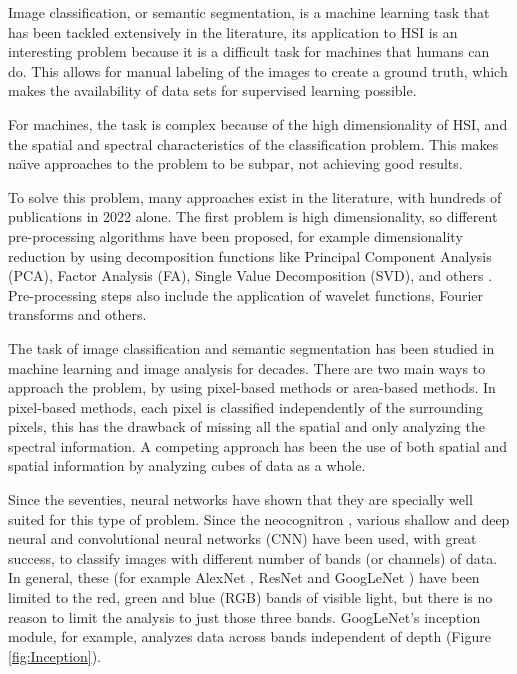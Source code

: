 \documentclass[lettersize, journal]{IEEEtran}
\begin{document}
Image classification, or semantic segmentation, is a machine learning task that has been tackled extensively in the literature, its application to HSI is an interesting problem because it is a difficult task for machines that humans can do. This allows for manual labeling of the images to create a ground truth, which makes the availability of data sets for supervised learning possible.

For machines, the task is complex because of the high dimensionality of HSI, and the spatial and spectral characteristics of the classification problem. This makes na\"{\i}ve approaches to the problem to be subpar, not achieving good results.

To solve this problem, many approaches exist in the literature, with hundreds of publications in 2022 alone. The first problem is high dimensionality, so different pre-processing algorithms have been proposed, for example dimensionality reduction by using decomposition functions like Principal Component Analysis (PCA), Factor Analysis (FA), Single Value Decomposition (SVD), and others \cite{meng_lightweight_2022}. Pre-processing steps also include the application of wavelet functions, Fourier transforms \cite{miclea_local_2020} and others.

\IEEEpubidadjcol

The task of image classification and semantic segmentation has been studied in machine learning and image analysis for decades. There are two main ways to approach the problem, by using pixel-based methods or area-based methods. In pixel-based methods, each pixel is classified independently of the surrounding pixels, this has the drawback of missing all the spatial and only analyzing the spectral information.
A competing approach has been the use of both spatial and spatial information by analyzing cubes of data as a whole.

Since the seventies, neural networks have shown that they are specially well suited for this type of problem. Since the neocognitron \cite{fukushima_neocognitron_1980}, various shallow and deep neural and convolutional neural networks (CNN) have been used, with great success, to classify images with different number of bands (or channels) of data. In general, these (for example AlexNet \cite{krizhevsky_imagenet_2017}, ResNet \cite{he_deep_2016} and GoogLeNet \cite{szegedy_going_2015}) have been limited to the red, green and blue (RGB) bands of visible light, but there is no reason to limit the analysis to just those three bands. GoogLeNet's inception module, for example, analyzes data across bands independent of depth (Figure \ref{fig:Inception}).
\end{document}
